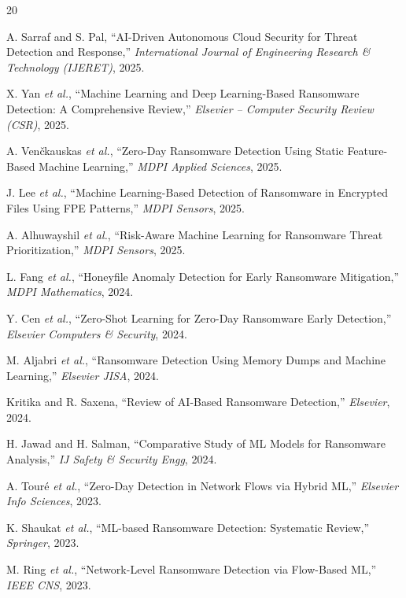 \documentclass[conference]{IEEEtran}
\begin{document}

\begin{thebibliography}{20}

A. Sarraf and S. Pal, ``AI-Driven Autonomous Cloud Security for Threat Detection and Response,'' \emph{International Journal of Engineering Research \& Technology (IJERET)}, 2025.

X. Yan \emph{et al.}, ``Machine Learning and Deep Learning-Based Ransomware Detection: A Comprehensive Review,'' \emph{Elsevier -- Computer Security Review (CSR)}, 2025.

A. Ven\v{c}kauskas \emph{et al.}, ``Zero-Day Ransomware Detection Using Static Feature-Based Machine Learning,'' \emph{MDPI Applied Sciences}, 2025.

J. Lee \emph{et al.}, ``Machine Learning-Based Detection of Ransomware in Encrypted Files Using FPE Patterns,'' \emph{MDPI Sensors}, 2025.

A. Alhuwayshil \emph{et al.}, ``Risk-Aware Machine Learning for Ransomware Threat Prioritization,'' \emph{MDPI Sensors}, 2025.

L. Fang \emph{et al.}, ``Honeyfile Anomaly Detection for Early Ransomware Mitigation,'' \emph{MDPI Mathematics}, 2024.

Y. Cen \emph{et al.}, ``Zero-Shot Learning for Zero-Day Ransomware Early Detection,'' \emph{Elsevier Computers \& Security}, 2024.

M. Aljabri \emph{et al.}, ``Ransomware Detection Using Memory Dumps and Machine Learning,'' \emph{Elsevier JISA}, 2024.

Kritika and R. Saxena, ``Review of AI-Based Ransomware Detection,'' \emph{Elsevier}, 2024.

H. Jawad and H. Salman, ``Comparative Study of ML Models for Ransomware Analysis,'' \emph{IJ Safety \& Security Engg}, 2024.

A. Touré \emph{et al.}, ``Zero-Day Detection in Network Flows via Hybrid ML,'' \emph{Elsevier Info Sciences}, 2023.

K. Shaukat \emph{et al.}, ``ML-based Ransomware Detection: Systematic Review,'' \emph{Springer}, 2023.

M. Ring \emph{et al.}, ``Network-Level Ransomware Detection via Flow-Based ML,'' \emph{IEEE CNS}, 2023.


\end{thebibliography}
\end{document}

